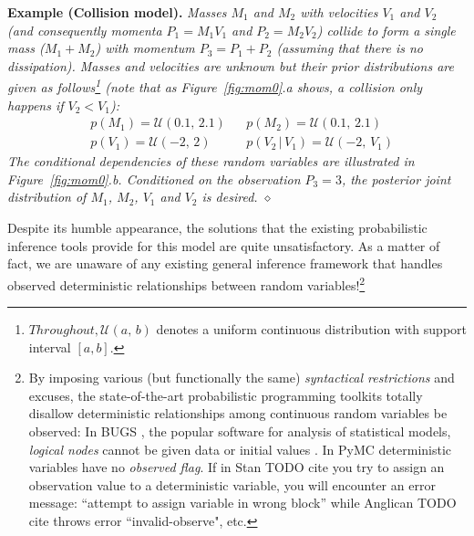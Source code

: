 \documentclass{article}
\newcommand{\pr}{p}
\begin{document}
{\bf Example (Collision model). }
\emph{Masses $M_1$ and $M_2$ with velocities $V_1$ and $V_2$ (and consequently momenta $P_1 = M_1 V_1$ and $P_2 = M_2 V_2$) collide to form a single mass ($M_1 + M_2$) with momentum $P_3 = P_1 + P_2$ (assuming that there is no dissipation).
Masses and velocities are unknown but 
their prior distributions are given as follows\footnote{
$Throughout, \mathcal{U}(a, \, b)$ denotes a uniform continuous distribution 
with {\color{green} support interval} $[a, b]$.
} 
(note that as Figure~\ref{fig:mom0}.a shows, a collision only happens if $V_2 < V_1$):  
}%
\begin{align}
&\pr(M_1) = \mathcal{U}(0.1, \, 2.1) 
&&\pr(M_2) = \mathcal{U}(0.1, \, 2.1)
\nonumber
\\
&\pr(V_1) = \mathcal{U}(-2, \, 2)
&&\pr(V_2 \, | \, V_1) = \mathcal{U}(-2, \, V_1)
\label{e:collision}
\end{align} 
\emph{
The conditional dependencies of these random variables are illustrated in 
Figure~\ref{fig:mom0}.b.
Conditioned on the observation $P_3 = 3$, the posterior joint distribution of $M_1$, $M_2$, $V_1$ and $V_2$ is desired. 
\hspace*{\fill} $\diamond$} %

Despite its humble appearance, the solutions that the existing probabilistic inference tools provide for this model are quite unsatisfactory. 
As a matter of fact, we are unaware of any existing general inference framework that 
handles observed deterministic relationships between random variables!\footnote{
By imposing various (but functionally the same)
\emph{syntactical restrictions} and excuses, 
the state-of-the-art probabilistic programming toolkits
totally disallow deterministic relationships among continuous random variables be observed:
In BUGS \cite{lunn2009bugs}, the popular software for analysis of statistical models, \emph{logical nodes} cannot be given data or initial values .
In PyMC \cite{patil2010pymc} deterministic variables have no \emph{observed flag}. 
If in Stan {\color{red}TODO cite} 
you try to assign an observation value to a deterministic variable, you will encounter an error message: 
``attempt to assign variable in wrong block'' while 
Anglican{\color{red} TODO cite} throws error ``invalid-observe", etc.}
\end{document}
